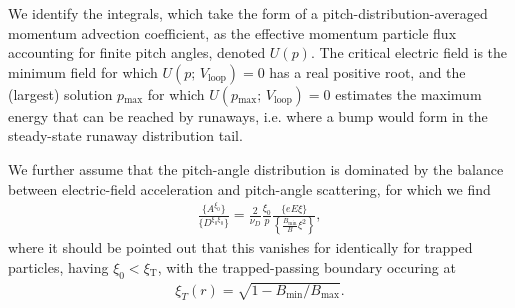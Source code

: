 \documentclass[11pt,a4paper]{article}
\newcommand{\sub}[1]{\ensuremath{_{\text{#1}}}}
\begin{document}
We identify the integrals, which take the form of a pitch-distribution-averaged momentum advection coefficient, as the effective momentum particle flux accounting for finite pitch angles, denoted $U(p)$. The critical electric field is the minimum field for which $U(p;\,V\sub{loop})=0$ has a real positive root, and the (largest) solution $p\sub{max}$ for which $U(p\sub{max}; \,V\sub{loop}) = 0$ estimates the maximum energy that can be reached by runaways, i.e. where a bump would form in the steady-state runaway distribution tail.

We further assume that the pitch-angle distribution is dominated by the balance between electric-field acceleration and pitch-angle scattering, for which we find
\begin{align}
\frac{\{A^{\xi_0}\}}{\{D^{\xi_0\xi_0}\}} = \frac{2}{\nu_D} \frac{\xi_0}{p} \frac{\{eE\xi \}}{\left\{\frac{B\sub{min}}{B}\xi^2\right\}},
\end{align}
where it should be pointed out that this vanishes for identically for trapped particles, having $\xi_0 < \xi\sub{T}$, with the trapped-passing boundary occuring at
\begin{align}
\xi_T(r) = \sqrt{1-B\sub{min}/B\sub{max}}.
\end{align}
\end{document}
